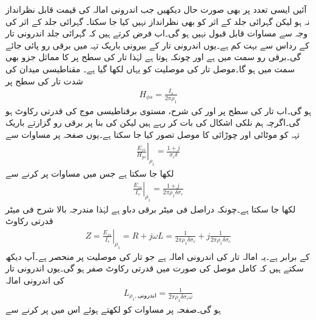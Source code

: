 آئیں ایسی تعدد پر بھی صورت حال دیکھیں جب اندرونی امالہ کی قیمت قابل نظرانداز نہ ہو لیکن گہرائی جلد کے اثر کو بھی نظرانداز نہیں کیا جا سکتا۔ گہرائی جلد کے اثر کی وجہ سے مساوات  قابل قبول نہیں ہو گی۔اب فرض کرتے ہیں کہ گہرائی جلد  اندرونی تار کے رداس  سے بہت کم ہے۔یوں اندرونی تار کے بیرونی باریک تہہ میں برقی رو پائی جائے گی۔برقی رو  سمت میں ہے اور چونکہ  ہوتا ہے لہٰذا تار کی سطح پر  کا مماثل جزو بھی  سمت میں ہو گا۔موصل تار کی موصلیت کو یہاں  لکھا گیا ہے۔ مقناطیسی میدان کی شدت تار کی سطح پر 
\begin{align}\label{مساوات_ترسیلی_ہم_محوری_تار_اندرونی_تار_مقناطیسی_میدان}
H_{\phi s}=\frac{I_s}{2\pi \rho_1}
\end{align}
ہو گی۔اب تار کی سطح پر  اور  کی شرح، مستوی برقناطیسی موج کی  قدرتی رکاوٹ ہو گی۔اگرچہ ہم نلکی اشکال کی بات کر رہے ہیں لیکن  کی بنا پر برقی رو گزارتے باریک تہہ کو  موٹائی اور  چوڑائی کا موصل تصور کیا جا سکتا ہے۔یوں صفحہ  پر مساوات  سے
\begin{align*}
\left. \frac{E_{zs}}{H_{ys}}\right|_{\rho_1}=\frac{1+j}{\sigma_c \delta}
\end{align*}
لکھا جا سکتا ہے جس میں مساوات  پر کرنے سے
\begin{align*}
\left. \frac{E_{zs}}{I_s} \right|_{\rho_1} =\frac{1+j}{2\pi \rho_1 \delta \sigma_c }
\end{align*}
لکھا جا سکتا ہے۔چونکہ  دراصل فی میٹر برقی دباو ہے لہٰذا مندرجہ بالا شرح فی میٹر قدرتی رکاوٹ
\begin{align}\label{مساوات_ترسیلی_رکاوٹ_بلند_تعدد_ہم_محوری}
Z=\left. \frac{E_{zs}}{I_s} \right|_{\rho_1}=R+j \omega L=\frac{1}{2\pi \rho_1 \delta \sigma_c }+j \frac{1}{2\pi \rho_1 \delta \sigma_c }
\end{align}
 کے برابر ہے۔یہ امالہ تار کی اندرونی امالہ ہے جو تار کی موصلیت  پر منحصر ہے۔آپ دیکھ سکتے ہیں کہ کامل موصل کی صورت میں قدرتی رکاوٹ صفر ہو گی۔یوں اندرونی تار کی اندرونی امالہ
\begin{align*}
L_{\rho_1,\text{اندرونی}}=\frac{1}{2\pi \rho_1 \delta \sigma_c \omega}
\end{align*}
ہو گی۔صفحہ  پر مساوات  کو  لکھتے ہوئے اس میں پر کرنے سے
